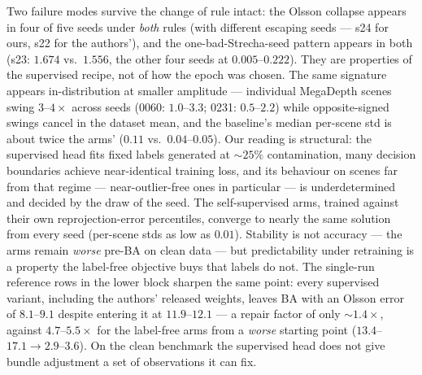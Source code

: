 \documentclass{article}
\begin{document}
Two failure modes survive the change of rule intact: the Olsson collapse appears in four
of five seeds under \emph{both} rules (with different escaping seeds --- s24 for ours,
s22 for the authors'), and the one-bad-Strecha-seed pattern appears in both (s23:
$1.674$ vs.\ $1.556$, the other four seeds at $0.005$--$0.222$). They are properties of
the supervised recipe, not of how the epoch was chosen. The same signature
appears in-distribution at smaller amplitude --- individual MegaDepth scenes swing
$3$--$4\times$ across seeds (0060: $1.0$--$3.3$; 0231: $0.5$--$2.2$) while opposite-signed
swings cancel in the dataset mean, and the baseline's median per-scene std is about twice
the arms' ($0.11$ vs.\ $0.04$--$0.05$). Our reading is structural: the supervised head
fits fixed labels generated at ${\sim}25\%$ contamination, many decision boundaries
achieve near-identical training loss, and its behaviour on scenes far from that regime
--- near-outlier-free ones in particular --- is underdetermined and decided by the draw
of the seed. The self-supervised arms, trained against their own reprojection-error
percentiles, converge to nearly the same solution from every seed (per-scene stds as low
as $0.01$). Stability is not accuracy --- the arms remain \emph{worse} pre-BA on clean
data --- but predictability under retraining is a property the label-free objective buys
that labels do not. The single-run reference rows in the lower block
sharpen the same point: every supervised variant, including the authors' released
weights, leaves BA with an Olsson error of $8.1$--$9.1$ despite entering it at
$11.9$--$12.1$ --- a repair factor of only ${\sim}1.4\times$, against $4.7$--$5.5\times$
for the label-free arms from a \emph{worse} starting point ($13.4$--$17.1 \to
2.9$--$3.6$). On the clean benchmark the supervised head does not give bundle adjustment
a set of observations it can fix.
\end{document}

